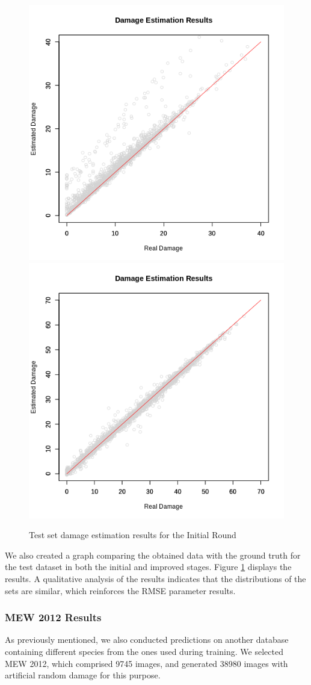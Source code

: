 \begin{figure}[h!]
    \centering
    \includegraphics[width = .45\linewidth]{Figures/v1-tst-estm.png}
    \includegraphics[width = .45\linewidth]{Figures/v2-tst-estm.png}
    \caption{Test set damage estimation results for the Initial Round}
    \label{fig:test_results}
\end{figure}

We also created a graph comparing the obtained data with the ground truth for the test dataset in both the initial and improved stages. Figure \ref{fig:test_results} displays the results. A qualitative analysis of the results indicates that the distributions of the sets are similar, which reinforces the RMSE parameter results.

\subsubsection{MEW 2012 Results}

As previously mentioned, we also conducted predictions on another database containing different species from the ones used during training. We selected MEW 2012, which comprised 9745 images, and generated 38980 images with artificial random damage for this purpose. 

